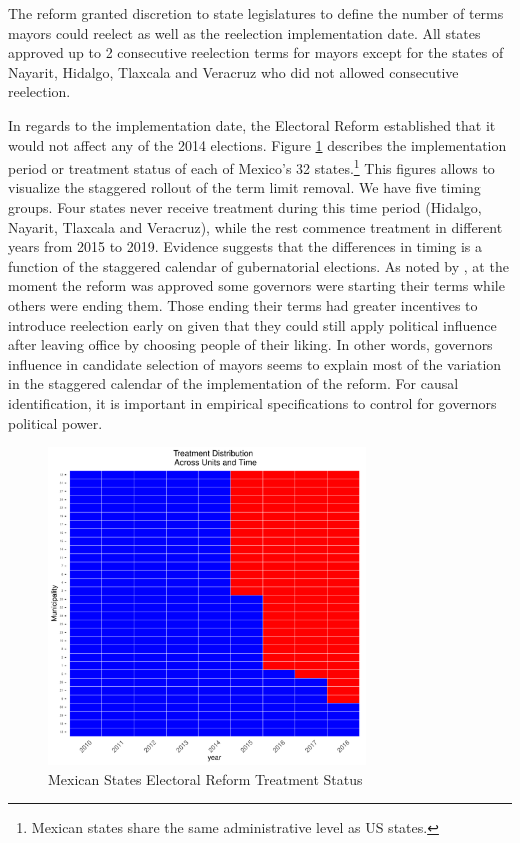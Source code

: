 \documentclass[12pt]{amsart}
\numberwithin{equation}{section}
\theoremstyle{definition}
\theoremstyle{definition}
\theoremstyle{definition}
\begin{document}
The reform granted discretion to state legislatures to define the number of terms mayors could reelect as well as the reelection implementation date. All states approved up to 2 consecutive reelection terms for mayors except for the states of Nayarit, Hidalgo, Tlaxcala and Veracruz who did not allowed consecutive reelection. 
  
In regards to the implementation date, the Electoral Reform established that it would not affect any of the 2014 elections. Figure \ref{fig:treatment_status} describes the implementation period or treatment status of each of Mexico's 32 states.\footnote{Mexican states share the same administrative level as US states.} This figures allows to visualize the staggered rollout of the term limit removal. We have five timing groups. Four states never receive treatment during this time period (Hidalgo, Nayarit, Tlaxcala and Veracruz), while the rest commence treatment in different years from 2015 to 2019. Evidence suggests that the differences in timing is a function of the staggered calendar of gubernatorial elections. As noted by \citet{motolinia_2020}, at the moment the reform was approved some governors were starting their terms while others were ending them. Those ending their terms had greater incentives to introduce reelection early on given that they could still apply political influence after leaving office by choosing people of their liking. In other words, governors influence in candidate selection of mayors seems to explain most of the variation in the staggered calendar of the implementation of the reform. For causal identification, it is important in empirical specifications to control for governors political power. 
   
\begin{figure}[h]   
\centering 
\caption{Mexican States Electoral Reform Treatment Status}
\label{fig:treatment_status}
\includegraphics[width=0.75\textwidth]{../Figures_incumbency/reform_treatmentstatus.pdf}     
\captionsetup{justification=centering} 
\end{figure}         
\end{document}
